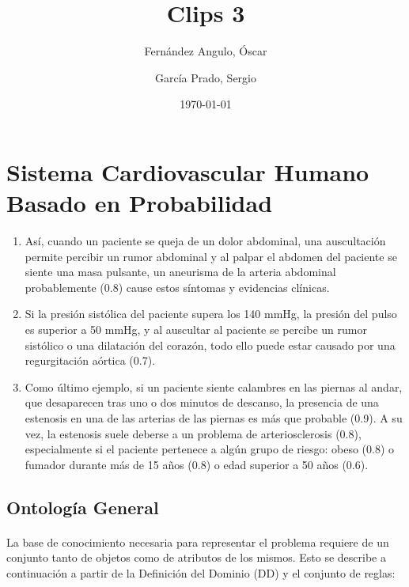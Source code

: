 \documentclass[10pt, a4paper,spanish]{article}
\title{\vspace{-15mm}\fontsize{24pt}{10pt}\selectfont\textbf{Clips 3}} %
\author{
	Fernández Angulo, Óscar \\
	\and
	García Prado, Sergio
}
\date{\today}
\begin{document}
	\maketitle %

	\thispagestyle{fancy} %



	\section{Sistema Cardiovascular Humano Basado en Probabilidad}

		\begin{enumerate}

			\item Así, cuando un paciente se queja de un dolor abdominal, una auscultación permite percibir un rumor abdominal y al palpar el abdomen del paciente se siente una masa pulsante, un aneurisma de la arteria abdominal probablemente (0.8) cause estos síntomas y evidencias clínicas.

			\item Si la presión sistólica del paciente supera los 140 mmHg, la presión del pulso es superior a 50 mmHg, y al auscultar al paciente se percibe un rumor sistólico o una dilatación del corazón, todo ello puede estar causado por una regurgitación aórtica (0.7).

			\item Como último ejemplo, si un paciente siente calambres en las piernas al andar, que desaparecen tras uno o dos minutos de descanso, la presencia de una estenosis en una de las arterias de las piernas es más que probable (0.9). A su vez, la estenosis suele deberse a un problema de arteriosclerosis (0.8), especialmente si el paciente pertenece a algún grupo de riesgo: obeso (0.8) o fumador durante más de 15 años (0.8) o edad superior a 50 años (0.6).

		\end{enumerate}

		\subsection{Ontología General}

			\paragraph{}
			La base de conocimiento necesaria para representar el problema requiere de un conjunto tanto de objetos como de atributos de los mismos. Esto se describe a continuación a partir de la Definición del Dominio (DD) y el conjunto de reglas:
\end{document}

